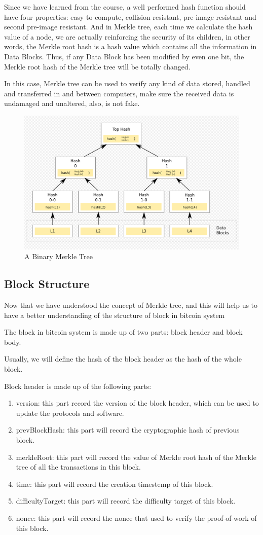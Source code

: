 \documentclass[12pt,a4paper]{article}
\begin{document}
Since we have learned from the course, a well performed hash function should have four properties: easy to compute, collision resistant, pre-image resistant and second pre-image resistant. And in Merkle tree, each time we calculate the hash value of a node, we are actually reinforcing the security of its children, in other words, the Merkle root hash is a hash value which contains all the information in Data Blocks. Thus, if any Data Block has been modified by even one bit, the Merkle root hash of the Merkle tree will be totally changed.

In this case, Merkle tree can be used to verify any kind of data stored, handled and transferred in and between computers, make sure the received data is undamaged and unaltered, also, is not fake.

\begin{figure}[htbp!]
	\centering
	\includegraphics[width=0.7\linewidth]{hash_tree.png}
	\caption{A Binary Merkle Tree}
	\label{fig::diagram}
\end{figure}

\subsection{Block Structure}
Now that we have understood the concept of Merkle tree, and this will help us to have a better understanding of the structure of block in bitcoin system

The block in bitcoin system is made up of two parts: block header and block body.

Usually, we will define the hash of the block header as the hash of the whole block.

Block header is made up of the following parts:
\begin{enumerate}
    \item 
    version: this part record the version of the block header, which can be used to update the protocols and software.
    \item
    prevBlockHash: this part will record the cryptographic hash of previous block.
    \item
    merkleRoot: this part will record the value of Merkle root hash of the Merkle tree of all the transactions in this block.
    \item
    time: this part will record the creation timestemp of this block.
    \item
    difficultyTarget: this part will record the difficulty target of this block.
    \item
    nonce: this part will record the nonce that used to verify the proof-of-work of this block.
\end{enumerate}
\end{document}
